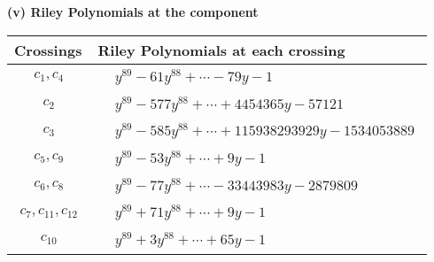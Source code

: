 \documentclass[1p]{elsarticle_modified}
\theoremstyle{definition}
\begin{document}
\flushleft \textbf{(v) Riley Polynomials at the component}\newline \\
\begin{tabular}{m{50pt}|m{274pt}}
Crossings & \hspace{64pt}Riley Polynomials at each crossing \\
\hline $$\begin{aligned}c_{1},c_{4}\end{aligned}$$&$\begin{aligned}
&y^{89}-61 y^{88}+\cdots-79 y-1
\end{aligned}$\\
\hline $$\begin{aligned}c_{2}\end{aligned}$$&$\begin{aligned}
&y^{89}-577 y^{88}+\cdots+4454365 y-57121
\end{aligned}$\\
\hline $$\begin{aligned}c_{3}\end{aligned}$$&$\begin{aligned}
&y^{89}-585 y^{88}+\cdots+115938293929 y-1534053889
\end{aligned}$\\
\hline $$\begin{aligned}c_{5},c_{9}\end{aligned}$$&$\begin{aligned}
&y^{89}-53 y^{88}+\cdots+9 y-1
\end{aligned}$\\
\hline $$\begin{aligned}c_{6},c_{8}\end{aligned}$$&$\begin{aligned}
&y^{89}-77 y^{88}+\cdots-33443983 y-2879809
\end{aligned}$\\
\hline $$\begin{aligned}c_{7},c_{11},c_{12}\end{aligned}$$&$\begin{aligned}
&y^{89}+71 y^{88}+\cdots+9 y-1
\end{aligned}$\\
\hline $$\begin{aligned}c_{10}\end{aligned}$$&$\begin{aligned}
&y^{89}+3 y^{88}+\cdots+65 y-1
\end{aligned}$\\
\hline
\end{tabular}\\~\\
\end{document}
